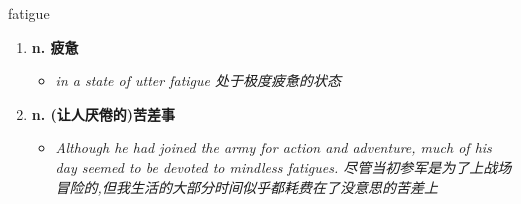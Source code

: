 
\begin{frame}
{\huge fatigue}
\begin{center}
\begin{enumerate}\Large
  \item \textbf{n. 疲惫}
  \begin{itemize}
    \item \em{\Large{in a state of utter fatigue 处于极度疲惫的状态}}
  \end{itemize}
  \item \textbf{n. (让人厌倦的)苦差事}
  \begin{itemize}
    \item \em{\Large{Although he had joined the army for action and adventure, much of his day seemed to be devoted to mindless fatigues. 尽管当初参军是为了上战场冒险的,但我生活的大部分时间似乎都耗费在了没意思的苦差上}}
  \end{itemize}
\end{enumerate}
\end{center}
\end{frame}
